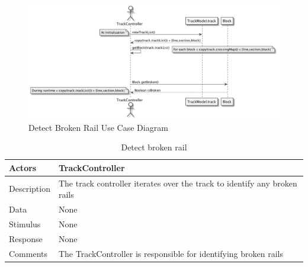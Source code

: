 \documentclass[]{article}
\begin{document}
\begin{figure}[H]
	\centering
	\includegraphics[scale=.5]{detectBroken.png}
	\caption{Detect Broken Rail Use Case Diagram}
\end{figure}

\begin{table}[H]
	\centering
	\caption{Detect broken rail}
	\begin{tabular}{|l|l|}
		\hline
		Actors & \parbox[t]{10cm}{TrackController} \\ \hline
		Description & \parbox[t]{10cm}{The track controller iterates over the track to identify any broken rails} \\ \hline
		Data &  \parbox[t]{10cm}{None} \\ \hline
		Stimulus &  \parbox[t]{10cm}{None} \\ \hline
		Response & \parbox[t]{10cm}{None}\\ \hline
		Comments & \parbox[t]{10cm}{The TrackController is responsible for identifying broken rails}  \\ \hline
	\end{tabular}
\end{table}
\end{document}
